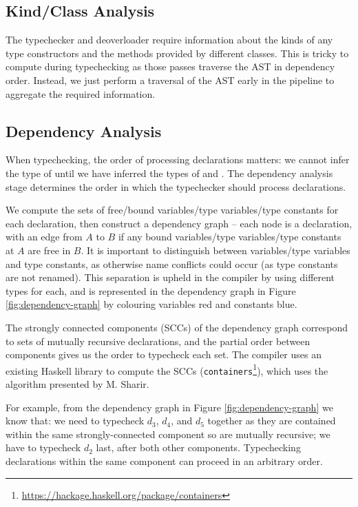\documentclass[dissertation.tex]{subfiles}
\begin{document}
{    \subsection{Kind/Class Analysis}
    {
        The typechecker and deoverloader require information about the kinds of any type constructors and the methods provided by different classes. This is tricky to compute during typechecking as those passes traverse the AST in dependency order. Instead, we just perform a traversal of the AST early in the pipeline to aggregate the required information. 
    }
    \subsection{Dependency Analysis}\label{sec:dependency-analysis}
    {
        When typechecking, the order of processing declarations matters: we cannot infer the type of  until we have inferred the types of  and . The dependency analysis stage determines the order in which the typechecker should process declarations. 

        We compute the sets of free/bound variables/type variables/type constants for each declaration, then construct a dependency graph -- each node is a declaration, with an edge from \(A\) to \(B\) if any bound variables/type variables/type constants at \(A\) are free in \(B\). It is important to distinguish between variables/type variables and type constants, as otherwise name conflicts could occur (as type constants are not renamed). This separation is upheld in the compiler by using different types for each, and is represented in the dependency graph in Figure \ref{fig:dependency-graph} by colouring variables red and constants blue.

        The strongly connected components (SCCs) of the dependency graph correspond to sets of mutually recursive declarations, and the partial order between components gives us the order to typecheck each set. The compiler uses an existing Haskell library to compute the SCCs (\texttt{containers}\footnote{\url{https://hackage.haskell.org/package/containers}}), which uses the algorithm presented by M. Sharir\cite{SCC}.

        For example, from the dependency graph in Figure \ref{fig:dependency-graph} we know that: we need to typecheck \(d_3\), \(d_4\), and \(d_5\) together as they are contained within the same strongly-connected component so are mutually recursive; we have to typecheck \(d_2\) last, after both other components. Typechecking declarations within the same component can proceed in an arbitrary order.

}}
\end{document}
